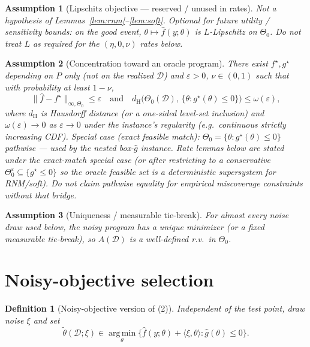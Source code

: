 \documentclass[11pt]{article}
\newtheorem{definition}{Definition}
\newtheorem{assumption}{Assumption}
\begin{document}
\begin{assumption}[Lipschitz objective --- reserved / unused in rates]
\label{ass:lip}
\textit{Not a hypothesis of Lemmas~\ref{lem:rnm}--\ref{lem:soft}.}
Optional for future utility / sensitivity bounds: on the good event,
$\theta\mapsto\hat f(y;\theta)$ is $L$-Lipschitz on $\Theta_0$.
Do not treat $L$ as required for the $(\eta,0,\nu)$ rates below.
\end{assumption}

\begin{assumption}[Concentration toward an oracle program]
\label{ass:conc}
There exist $f^\star,g^\star$ depending on $P$ only (not on the realized $\mathcal{D}$) and
$\varepsilon>0$, $\nu\in(0,1)$ such that with probability at least $1-\nu$,
\[
\|\hat f-f^\star\|_{\infty,\Theta_0}\le\varepsilon
\quad\text{and}\quad
d_{\mathrm{H}}\bigl(\Theta_0(\mathcal{D}),\,\{\theta:g^\star(\theta)\le 0\}\bigr)\le \omega(\varepsilon),
\]
where $d_{\mathrm{H}}$ is Hausdorff distance (or a one-sided level-set inclusion) and
$\omega(\varepsilon)\to0$ as $\varepsilon\to0$ under the instance's regularity
(e.g.\ continuous strictly increasing CDF).
\textit{Special case (exact feasible match):} $\Theta_0=\{\theta:g^\star(\theta)\le 0\}$
pathwise --- used by the nested box-$\hat g$ instance.
\textit{Rate lemmas below} are stated under the exact-match special case (or after
restricting to a conservative $\Theta_0^\varepsilon\subseteq\{g^\star\le 0\}$ so the
oracle feasible set is a deterministic supersystem for RNM/soft). Do not claim
pathwise equality for empirical miscoverage constraints without that bridge.
\end{assumption}

\begin{assumption}[Uniqueness / measurable tie-break]
\label{ass:uniq}
For almost every noise draw used below, the noisy program has a unique minimizer
(or a fixed measurable tie-break), so $A(\mathcal{D})$ is a well-defined r.v.\ in $\Theta_0$.
\end{assumption}

\section{Noisy-objective selection}

\begin{definition}[Noisy-objective version of (2)]
\label{def:noisy-obj}
Independent of the test point, draw noise $\xi$ and set
\begin{equation}
\tilde\theta(\mathcal{D};\xi)
\in
\operatorname*{arg\,min}_{\theta}
\bigl\{\hat f(y;\theta)+\langle\xi,\theta\rangle:\hat g(\theta)\le 0\bigr\}.
\tag{2$_\xi$}
\end{equation}
\end{definition}
\end{document}
